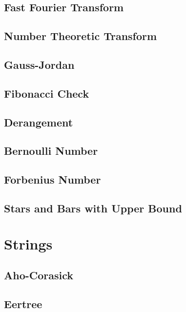 \subsection{Fast Fourier Transform}

\subsection{Number Theoretic Transform}

\subsection{Gauss-Jordan}

\subsection{Fibonacci Check}

\subsection{Derangement}

\subsection{Bernoulli Number}

\subsection{Forbenius Number}

\subsection{Stars and Bars with Upper Bound}

\section{Strings}
\subsection{Aho-Corasick}

\subsection{Eertree}

